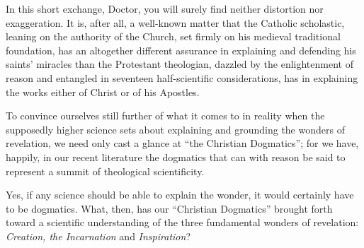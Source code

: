 \documentclass[12pt,a4paper]{article}
\begin{document}
In this short exchange, Doctor, you will surely find neither
distortion nor exaggeration. It is, after all, a well-known matter
that the Catholic scholastic, leaning on the authority of the
Church, set firmly on his medieval traditional foundation, has an
altogether different assurance in explaining and defending his
saints' miracles than the Protestant theologian, dazzled by the
enlightenment of reason and entangled in seventeen half-scientific
considerations, has in explaining the works either of Christ or of
his Apostles.

To convince ourselves still further of what it comes to in reality
when the supposedly higher science sets about explaining and
grounding the wonders of revelation, we need only cast a glance at
``the Christian Dogmatics''; for we have, happily, in our recent
literature the dogmatics that can with reason be said to represent a
summit of theological scientificity.

Yes, if any science should be able to explain the wonder, it would
certainly have to be dogmatics. What, then, has our ``Christian
Dogmatics'' brought forth toward a scientific understanding of the
three fundamental wonders of revelation: \emph{Creation, the
Incarnation} and \emph{Inspiration}?
\end{document}
